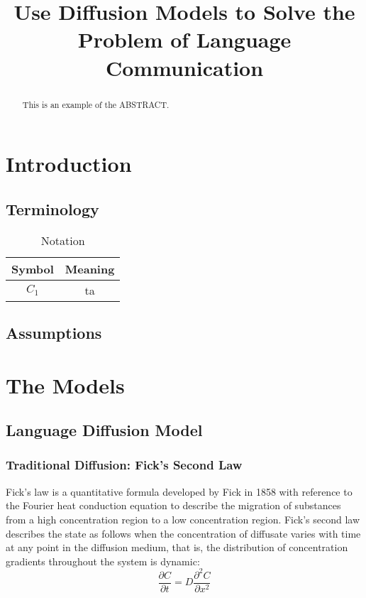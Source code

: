 \documentclass{mcmthesis}
\title{Use Diffusion Models to Solve the Problem of Language Communication}
\begin{document}
\setlength{parindent}{2em}%

  \begin{abstract}
    This is an example of the ABSTRACT.
  \end{abstract}

  \maketitle
  \tableofcontents

  \section{Introduction}%

    \subsection{Terminology}%

    \begin{table}[h]
    \centering
    \caption{Notation}

    \begin{tabular}{cc}
    \toprule
    Symbol&Meaning\\
    \midrule
    {$C_1$}&ta\\
    \bottomrule
    \end{tabular}
  \end{table}
    \subsection{Assumptions}%

  \section{The Models}


    \subsection{Language Diffusion Model}%
    \subsubsection{Traditional Diffusion: Fick's Second Law}%

    Fick's law is a quantitative formula developed by Fick in 1858
    with reference to the Fourier heat conduction equation
    to describe the migration of substances
    from a high concentration region to a low concentration region.
    Fick's second law describes the state as follows
    when the concentration of diffusate varies with time at any point in the diffusion medium,
    that is, the distribution of concentration gradients throughout the system is dynamic:
    $$\frac{\partial C}{\partial t}=D\frac{\partial^2C}{\partial x^2}$$
\end{document}
